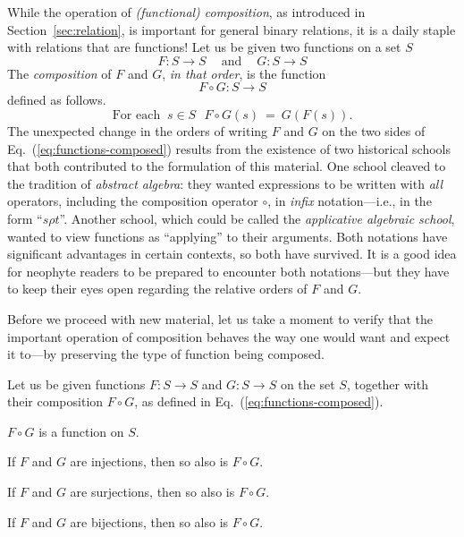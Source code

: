  
While the operation of {\it (functional) composition}, as introduced in Section~\ref{sec:relation}, is important for general binary relations, it is a daily staple with relations that are functions!  Let us be given two functions on a set $S$
\[
F: S \rightarrow S \ \ \ \ \mbox{ and } \ \ \ \ G: S \rightarrow S
\]
The {\it composition} of $F$ and $G$, {\em in that order}, is the function
\[ F \circ G: S \rightarrow S \]
defined as follows.
\begin{equation}
\label{eq:functions-composed}
\mbox{For each } \ s \in S \ \ \
F \circ G(s) \ = \ G(F(s)).
\end{equation}
The unexpected change in the orders of writing $F$ and $G$ on the two sides of Eq.~(\ref{eq:functions-composed}) results from the existence of two historical schools that both contributed to the formulation of this material.  One school cleaved to the tradition of {\it abstract algebra}:  they wanted expressions to be written with {\em all} operators, including the composition operator $\circ$, in {\em infix} notation---i.e., in the form ``$s \rho t$''.  Another school, which could be called the {\it applicative algebraic school}, wanted to view functions as ``applying'' to their arguments.  Both notations have significant advantages in certain contexts, so both have survived.  It is a good idea for neophyte readers to be prepared to encounter both notations---but they have to keep their eyes open regarding the relative orders of $F$ and
$G$.  \index{composition!functions!notation}

\medskip

Before we proceed with new material, let us take a moment to verify that the important operation of composition behaves the way one would want and expect it to---by preserving the type of function being composed.

\begin{prop}
\label{thm:fn-composition}
Let us be given functions $F: S \rightarrow S$ and $G: S \rightarrow S$ on the set $S$, together with their composition $F \circ G$, as defined in Eq.~(\ref{eq:functions-composed}).

$F \circ G$ is a function on $S$.

If $F$ and $G$ are injections, then so also is $F \circ G$.

If $F$ and $G$ are surjections, then so also is $F \circ G$.

If $F$ and $G$ are bijections, then so also is $F \circ G$.
\end{prop}

